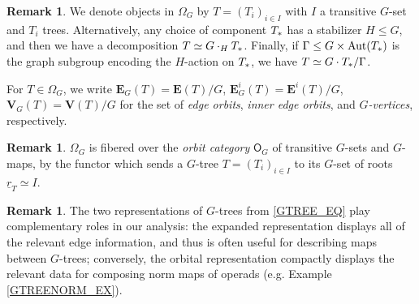 \documentclass[a4paper,10pt
,draft
]{article}%
\numberwithin{equation}{section}
\numberwithin{figure}{section}
\theoremstyle{definition} %
\newtheorem{remark}[equation]{Remark}%
\DeclareMathOperator{\Aut}{Aut}%
\newcommand{\1}{\ensuremath{\mathbbm 1}}%
\begin{document}
\begin{remark}
      We denote objects in $\Omega_G$ by $T = (T_i)_{i \in I}$ with $I$ a transitive $G$-set and $T_i$ trees.
      Alternatively, any choice of component $T_{\**}$ has a stabilizer $H \leq G$, and then we have a decomposition
      $T \simeq G \cdot_H T_{\**}$.
      Finally, if $\Gamma \leq G \times \Aut(T_{\**})$ is the graph subgroup encoding the $H$-action on $T_{\**}$, we have
      $T \simeq G \cdot T_{\**}/\Gamma$.
\end{remark}
For $T \in \Omega_G$, we write
$\boldsymbol{E}_G(T) = \boldsymbol{E}(T)/G$, $\boldsymbol{E}^i_G(T) = \boldsymbol{E}^i(T)/G$, $\boldsymbol{V}_G(T) = \boldsymbol{V}(T)/G$
for the set of \textit{edge orbits}, \textit{inner edge orbits}, and \textit{$G$-vertices}, respectively.

\begin{remark}
      $\Omega_G$ is fibered over the \textit{orbit category} $\mathsf O_G$ of transitive $G$-sets and $G$-maps,
      by the functor which sends a $G$-tree $T = (T_i)_{i \in I}$ to its $G$-set of roots $\underline{r}_T \simeq I$.
\end{remark}


\begin{remark}
      The two representations of $G$-trees from \eqref{GTREE_EQ} play complementary roles in our analysis:
      the expanded representation displays all of the relevant edge information, and thus is often useful for describing maps between $G$-trees;
      conversely, the orbital representation compactly displays the relevant data for composing norm maps of operads (e.g. {\color{blue} Example \ref{GTREENORM_EX}}).
\end{remark}
\end{document}
